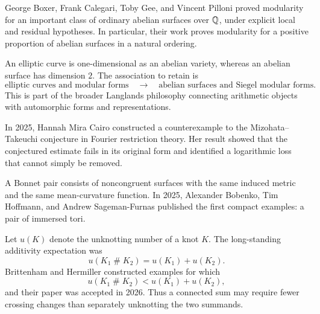    \begin{fact}
        George Boxer, Frank Calegari, Toby Gee, and Vincent Pilloni proved
        modularity for an important class of ordinary abelian surfaces over
        $\mathbb{Q}$, under explicit local and residual hypotheses. In particular, their
        work proves modularity for a positive proportion of abelian surfaces in
        a natural ordering.
    \end{fact}

    \begin{idea}
        An elliptic curve is one-dimensional as an abelian variety, whereas an
        abelian surface has dimension $2$. The association to retain is
        \[
            \text{elliptic curves and modular forms}
            \quad\longrightarrow\quad
            \text{abelian surfaces and Siegel modular forms}.
        \]
        This is part of the broader Langlands philosophy connecting arithmetic
        objects with automorphic forms and representations.
    \end{idea}

    \begin{fact}
        In 2025, Hannah Mira Cairo constructed a counterexample to the
        Mizohata--Takeuchi conjecture in Fourier restriction theory. Her result
        showed that the conjectured estimate fails in its original form and
        identified a logarithmic loss that cannot simply be removed.
    \end{fact}

    \begin{fact}
        A Bonnet pair consists of noncongruent surfaces with the same induced
        metric and the same mean-curvature function. In 2025, Alexander Bobenko,
        Tim Hoffmann, and Andrew Sageman-Furnas published the first compact
        examples: a pair of immersed tori.
    \end{fact}

    \begin{fact}
        Let $u(K)$ denote the unknotting number of a knot $K$. The long-standing
        additivity expectation was
        \[
            u(K_1\mathbin{\#}K_2)
            =
            u(K_1)+u(K_2).
        \]
        Brittenham and Hermiller constructed examples for which
        \[
            u(K_1\mathbin{\#}K_2)
            <
            u(K_1)+u(K_2),
        \]
        and their paper was accepted in 2026. Thus a connected sum may require
        fewer crossing changes than separately unknotting the two summands.
    \end{fact}

